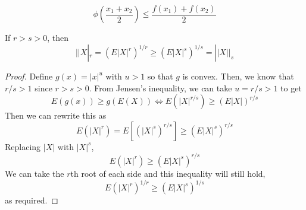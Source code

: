 \documentclass[openany]{report}
\begin{document}
\[\phi\left(\frac{x_1 + x_2}{2}\right) \leq \frac{f(x_1)+f(x_2)}{2}\] 
\begin{theorem}
    If $r > s > 0$, then 
    \[||X|_r = (E|X|^r)^{1/r} \geq (E|X|^s)^{1/s} = ||X||_s\]
\end{theorem}
\begin{proof}
    Define $g(x) = |x|^u$ with $u > 1$ so that $g$ is convex. Then, we know that $r/s > 1$ since $r > s > 0$. From Jensen's inequality, we can take $u = r/s > 1$ to get
    \[E(g(x)) \geq g(E(X)) \iff E(|X|^{r/s}) \geq (E|X|)^{r/s}\]
    Then we can rewrite this as
    \[E(|X|^r) = E\left[(|X|^s)^{r/s}\right] \geq (E|X|^s)^{r/s}\]
    Replacing $|X|$ with $|X|^s$, 
    \[E(|X|^r) \geq (E|X|^s)^{r/s}\]
    We can take the $r$th root of each side and this inequality will still hold, 
    \[E(|X|^r)^{1/r} \geq (E|X|^s)^{1/s}\]
    as required.
\end{proof}
\end{document}
